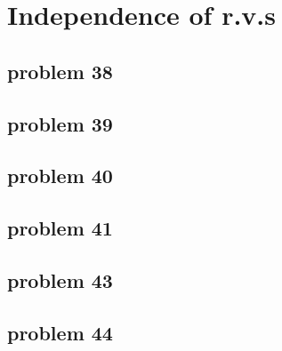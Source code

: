 \section{Independence of r.v.s}

\subsection{problem 38}


\subsection{problem 39}


\subsection{problem 40}


\subsection{problem 41}


\subsection{problem 43}


\subsection{problem 44}

